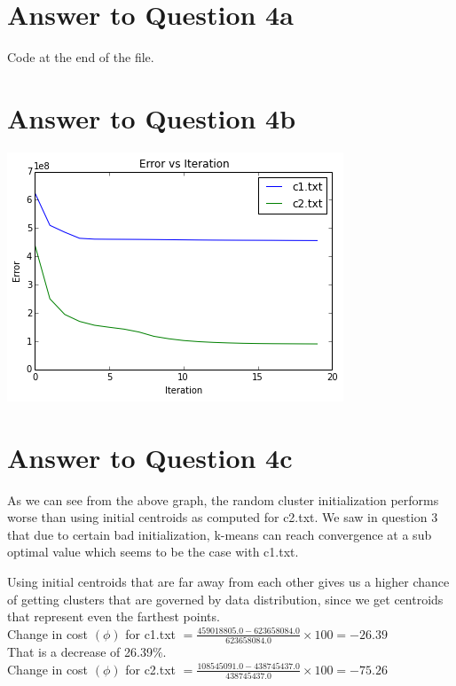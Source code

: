 \documentclass[11pt]{article}
\begin{document}
{\pagebreak[4]
\section*{Answer to Question 4a}
Code at the end of the file.

\pagebreak[4]
\section*{Answer to Question 4b}
\includegraphics*{q4err}\\

\pagebreak[4]
\section*{Answer to Question 4c}
As we can see from the above graph, the random cluster initialization performs worse than using initial centroids as computed for c2.txt. We saw in question 3 that due to certain bad initialization, k-means can reach convergence at a sub optimal value which seems to be the case with c1.txt. 

Using initial centroids that are far away from each other gives us a higher chance of getting clusters that are governed by data distribution, since we get centroids that represent even the farthest points.\\

Change in cost $(\phi)$ for c1.txt $= \frac{459018805.0 - 623658084.0}{623658084.0} \times 100 = -26.39$\\

That is a decrease of 26.39$\%$.\\

Change in cost $(\phi)$ for c2.txt $= \frac{108545091.0 - 438745437.0}{438745437.0} \times 100 = -75.26$\\

}
\end{document}
